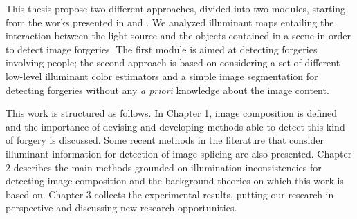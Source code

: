 This thesis propose two different approaches, divided into two modules, starting from the works presented in \cite{carvalho2016illuminant} and \cite{fan2015image}. We analyzed illuminant maps entailing the interaction between the light source and the objects contained in a scene in order to detect image forgeries.  The first module is aimed at detecting forgeries involving people; the second approach is based on considering a set of different low-level illuminant color estimators  and a simple image segmentation for detecting forgeries without any \emph{a priori} knowledge about the image content. 

This work is structured as follows. In Chapter 1, image composition is defined and the importance of devising and developing methods able to detect this kind of forgery is discussed. Some recent methods in the literature that consider illuminant information for detection of image splicing are also presented. Chapter 2 describes the main methods grounded on illumination inconsistencies for detecting image composition and the background theories on which this work is based on. Chapter 3 collects the experimental results, putting our research in perspective and discussing new research opportunities.